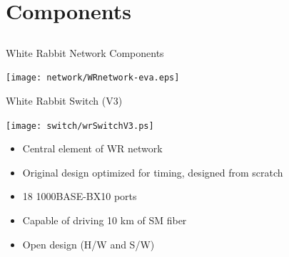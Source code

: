 \documentclass[compress,red]{beamer}
\begin{document}
\section{Components}
\subsection{}
\begin{frame}{White Rabbit Network Components}


    \begin{center}
    \texttt{[image: network/WRnetwork-eva.eps]}  
    \end{center}

\end{frame}
\begin{frame}{White Rabbit Switch (V3)}

    \begin{center}
    \texttt{[image: switch/wrSwitchV3.ps]}
    \end{center}

	\begin{itemize}
	\item Central element of WR network
	\item Original design optimized for timing, designed from scratch
	\item 18 1000BASE-BX10 ports
	\item Capable of driving 10 km of SM fiber
	\item Open design (H/W and S/W)
	\end{itemize}

\end{frame}
\end{document}
